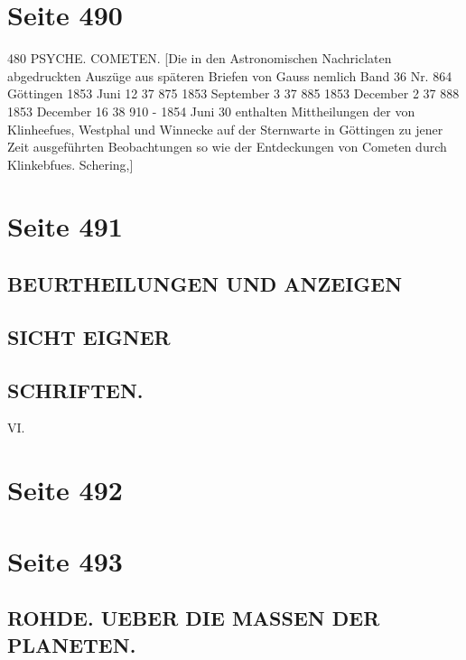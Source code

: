 \documentclass[10pt,a4paper]{article}
\begin{document}
\newpage
\section*{Seite 490}

480  PSYCHE.    COMETEN.
[Die  in  den  Astronomischen  Nachriclaten  abgedruckten  Auszüge   aus  späteren  Briefen  von  Gauss
nemlich  Band  36  Nr.  864  Göttingen  1853  Juni  12
37  875  1853  September  3
37  885  1853  December  2
37  888  1853  December  16
38  910  -  1854  Juni  30
enthalten  Mittheilungen  der  von  Klinheefues,  Westphal  und  Winnecke  auf  der  Sternwarte  in  Göttingen
zu  jener  Zeit  ausgeführten  Beobachtungen  so  wie  der  Entdeckungen  von  Cometen  durch  Klinkebfues.
Schering,]

\newpage
\section*{Seite 491}

\subsection*{BEURTHEILUNGEN  UND  ANZEIGEN}

\subsection*{SICHT  EIGNER}

\subsection*{SCHRIFTEN.}

VI.

\newpage
\section*{Seite 492}



\newpage
\section*{Seite 493}

\subsection*{ROHDE.    UEBER  DIE  MASSEN  DER  PLANETEN.}
\end{document}
